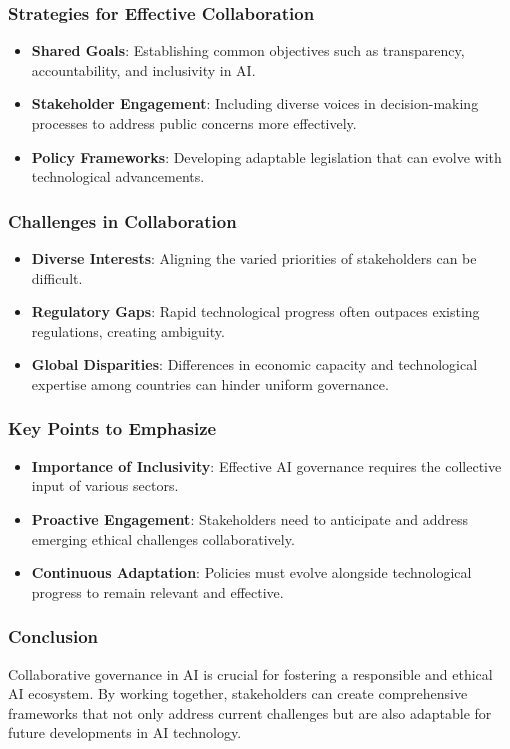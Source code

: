 \documentclass[aspectratio=169]{beamer}
\begin{document}
\begin{frame}[fragile]
    \frametitle{Strategies for Effective Collaboration}
    \begin{itemize}
        \item \textbf{Shared Goals}: Establishing common objectives such as transparency, accountability, and inclusivity in AI.
        \item \textbf{Stakeholder Engagement}: Including diverse voices in decision-making processes to address public concerns more effectively.
        \item \textbf{Policy Frameworks}: Developing adaptable legislation that can evolve with technological advancements.
    \end{itemize}
\end{frame}

\begin{frame}[fragile]
    \frametitle{Challenges in Collaboration}
    \begin{itemize}
        \item \textbf{Diverse Interests}: Aligning the varied priorities of stakeholders can be difficult.
        \item \textbf{Regulatory Gaps}: Rapid technological progress often outpaces existing regulations, creating ambiguity.
        \item \textbf{Global Disparities}: Differences in economic capacity and technological expertise among countries can hinder uniform governance.
    \end{itemize}
\end{frame}

\begin{frame}[fragile]
    \frametitle{Key Points to Emphasize}
    \begin{itemize}
        \item \textbf{Importance of Inclusivity}: Effective AI governance requires the collective input of various sectors.
        \item \textbf{Proactive Engagement}: Stakeholders need to anticipate and address emerging ethical challenges collaboratively.
        \item \textbf{Continuous Adaptation}: Policies must evolve alongside technological progress to remain relevant and effective.
    \end{itemize}
\end{frame}

\begin{frame}[fragile]
    \frametitle{Conclusion}
    Collaborative governance in AI is crucial for fostering a responsible and ethical AI ecosystem. By working together, stakeholders can create comprehensive frameworks that not only address current challenges but are also adaptable for future developments in AI technology.
\end{frame}
\end{document}
